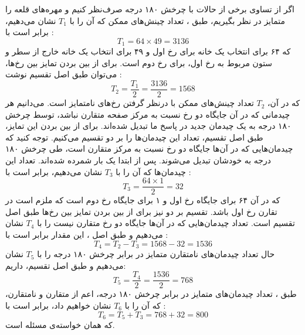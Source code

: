 \p
اگر از تساوی برخی از حالات با چرخش ۱۸۰ درجه صرف‌نظر کنیم و مهره‌های قلعه را متمایز در نظر بگیریم،
طبق 
، تعداد چینش‌های ممکن که آن را با $T_1$ نشان می‌دهیم، برابر است با :
  $$T_1 = 64 \times 49 = 3136$$
که ۶۴ برای انتخاب یک خانه برای رخ اول و ۴۹ برای انتخاب یک خانه خارج از سطر و ستون
مربوط به رخ اول، برای رخ دوم است. برای از بین بردن تمایز بین رخ‌ها، می‌توان طبق اصل تقسیم نوشت :
  $$T_2 = \frac{T_1}{2} = \frac{3136}{2} = 1568$$
  که در آن، $T_2$ تعداد چینش‌های ممکن با درنظر گرفتن رخ‌های نامتمایز است.
  \p
می‌دانیم هر چیدمانی که در آن جایگاه دو رخ نسبت به مرکز صفحه متقارن نباشد، توسط چرخش ۱۸۰ درجه به
یک چیدمان جدید در پاسخ ما تبدیل شده‌اند.
برای از بین بردن این تمایز، طبق اصل تقسیم، تعداد این چیدمان‌ها را بر دو تقسیم می‌کنیم.
توجه کنید که چیدمان‌هایی که در آن‌ها جایگاه دو رخ نسبت به مرکز متقارن است،
طی چرخش ۱۸۰ درجه به خودشان تبدیل می‌شوند. پس از ابتدا یک بار شمرده شده‌اند. تعداد این چیدمان‌ها
که آن را با $T_3$ نشان می‌دهیم، برابر است با : 
  $$T_3 = \frac{64 \times 1}{2} = 32$$
که در آن ۶۴ برای جایگاه رخ اول و ۱ برای جایگاه رخ دوم است که ملزم است در تقارن رخ اول باشد.
تقسیم بر دو نیز برای از بین بردن تمایز بین رخ‌ها طبق اصل تقسیم است.
تعداد چیدمان‌هایی که در آن‌ها جایگاه دو رخ متقارن نیست را با
$T_4$
نشان می‌دهیم و طبق اصل 
، این مقدار برابر است با :
  $$T_4 = T_2 - T_3 = 1568 - 32 = 1536$$
  \p
حال تعداد چیدمان‌های نامتقارن متمایز در برابر چرخش ۱۸۰ درجه را با
$T_5$
نشان می‌دهیم و طبق اصل تقسیم، داریم:
  $$T_5 = \frac{T_4}{2} = \frac{1536}{2} = 768$$
  \p
طبق 
، تعداد چیدمان‌های متمایز در برابر چرخش ۱۸۰ درجه، اعم از متقارن و نامتقارن، که آن را با $T_6$ نشان خواهیم داد،
 برابر است با :
  $$T_6 = T_5 + T_3 = 768 + 32 = 800$$
  که همان خواسته‌ی مسئله است.